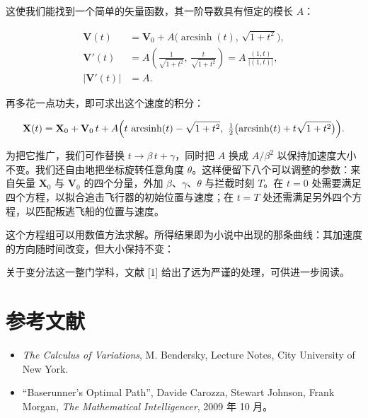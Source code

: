 这使我们能找到一个简单的矢量函数，其一阶导数具有恒定的模长 $A$：

\begin{align}
\mathbf{V}(t) &= \mathbf{V}_0+A\bigl(\operatorname{arcsinh}(t),\,\sqrt{1+t^{2}}\bigr), \\
\mathbf{V}'(t) &= A\left(\frac{1}{\sqrt{1+t^{2}}},\,\frac{t}{\sqrt{1+t^{2}}}\right)=A\,\frac{(1,t)}{|(1,t)|}, \\
|\mathbf{V}'(t)| &= A .
\end{align}

再多花一点功夫，即可求出这个速度的积分：

\begin{equation}
\mathbf{X}(t)=\mathbf{X}_0+\mathbf{V}_0\,t+A\Bigl(t\,\operatorname{arcsinh}(t)-\sqrt{1+t^{2}},\ \half\bigl(\operatorname{arcsinh}(t)+t\sqrt{1+t^{2}}\bigr)\Bigr).
\end{equation}

为把它推广，我们可作替换 $t\to\beta\,t+\gamma$，同时把 $A$ 换成 $A/\beta^{2}$ 以保持加速度大小不变。我们还自由地把坐标旋转任意角度 $\theta$。这样便留下八个可以调整的参数：来自矢量 $\mathbf{X}_0$ 与 $\mathbf{V}_0$ 的四个分量，外加 $\beta$、$\gamma$、$\theta$ 与拦截时刻 $T$。在 $t=0$ 处需要满足四个方程，以拟合追击飞行器的初始位置与速度；在 $t=T$ 处还需满足另外四个方程，以匹配叛逃飞船的位置与速度。

这个方程组可以用数值方法求解。所得结果即为小说中出现的那条曲线：其加速度的方向随时间改变，但大小保持不变：


关于变分法这一整门学科，文献 [1] 给出了远为严谨的处理，可供进一步阅读。

\section{参考文献}

\begin{itemize}
  \item [{[1]}] \emph{The Calculus of Variations}, M. Bendersky, Lecture Notes, City University of New York.
  \item [{[2]}] ``Baserunner's Optimal Path'', Davide Carozza, Stewart Johnson, Frank Morgan, \emph{The Mathematical Intelligencer}, 2009 年 10 月。
\end{itemize}

